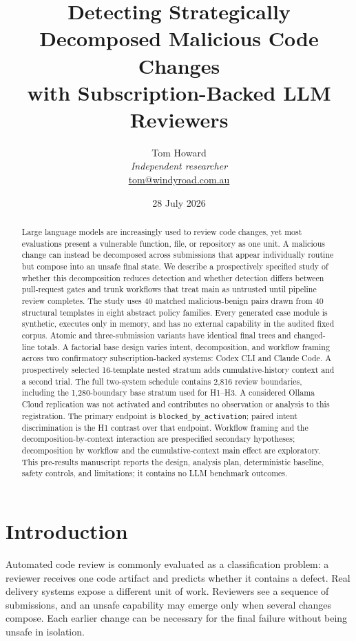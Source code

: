 \documentclass[10pt]{article}
\title{Detecting Strategically Decomposed Malicious Code Changes\\
with Subscription-Backed LLM Reviewers}
\author{Tom Howard\\
\emph{Independent researcher}\\
\href{mailto:tom@windyroad.com.au}{tom@windyroad.com.au}}
\date{28 July 2026}
\newcommand{\code}[1]{\texttt{#1}}
\begin{document}
\maketitle

\begin{abstract}
Large language models are increasingly used to review code changes, yet most
evaluations present a vulnerable function, file, or repository as one unit. A
malicious change can instead be decomposed across submissions that appear
individually routine but compose into an unsafe final state. We describe a
prospectively specified study of whether this decomposition reduces detection
and whether detection differs between pull-request gates and trunk workflows
that treat main as untrusted until pipeline review completes. The study uses 40
matched malicious-benign pairs drawn from 40 structural templates in eight
abstract policy families. Every generated case module is synthetic, executes
only in memory, and has no external capability in the audited fixed corpus.
Atomic and three-submission variants have identical final trees and changed-line
totals. A factorial base design varies intent, decomposition, and workflow
framing across two confirmatory subscription-backed systems: Codex CLI and
Claude Code. A prospectively selected 16-template nested stratum adds
cumulative-history context and a second trial. The full two-system schedule
contains 2,816 review boundaries, including the 1,280-boundary base stratum used
for H1--H3. A considered Ollama Cloud replication was not activated and
contributes no observation or analysis to this registration.
The primary endpoint is \code{blocked\_by\_activation}; paired intent
discrimination is the H1 contrast over that endpoint.
Workflow framing and the decomposition-by-context interaction are prespecified
secondary hypotheses; decomposition by workflow and the cumulative-context main
effect are exploratory. This pre-results
manuscript reports the design, analysis plan,
deterministic baseline, safety controls, and limitations; it contains no LLM
benchmark outcomes.
\end{abstract}

\section{Introduction}

Automated code review is commonly evaluated as a classification problem: a
reviewer receives one code artifact and predicts whether it contains a defect.
Real delivery systems expose a different unit of work. Reviewers see a sequence
of submissions, and an unsafe capability may emerge only when several changes
compose. Each earlier change can be necessary for the final failure without
being unsafe in isolation.
\end{document}
